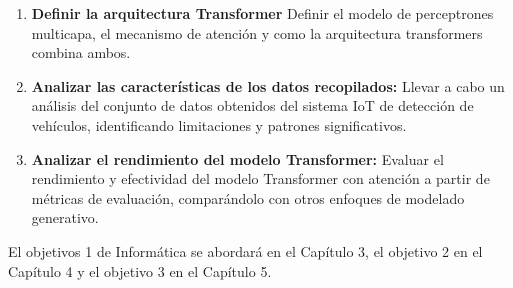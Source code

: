     \begin{enumerate}
        \item \textbf{Definir la arquitectura Transformer} 
        Definir el modelo de perceptrones multicapa, el mecanismo de atención y
        como la arquitectura transformers combina ambos.

        \item \textbf{Analizar las características de los datos recopilados:} 
        Llevar a cabo un análisis del conjunto de datos obtenidos del sistema
        IoT de detección de vehículos, identificando limitaciones y patrones
        significativos.
        
        \item \textbf{Analizar el rendimiento del modelo Transformer:} 
        Evaluar el rendimiento y efectividad del modelo Transformer con atención
        a partir de métricas de evaluación, comparándolo con otros enfoques de
        modelado generativo.
        
    \end{enumerate}
    
El objetivos 1 de Informática se abordará en el Capítulo 3, el objetivo 2 en el Capítulo 4 y el objetivo 3 en el
Capítulo 5. 
